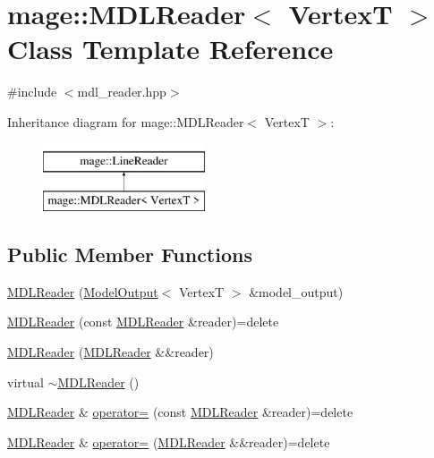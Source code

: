 \hypertarget{classmage_1_1_m_d_l_reader}{}\section{mage\+:\+:M\+D\+L\+Reader$<$ VertexT $>$ Class Template Reference}
\label{classmage_1_1_m_d_l_reader}


{\ttfamily \#include $<$mdl\+\_\+reader.\+hpp$>$}

Inheritance diagram for mage\+:\+:M\+D\+L\+Reader$<$ VertexT $>$\+:\begin{figure}[H]
\begin{center}
\leavevmode
\includegraphics[height=2.000000cm]{classmage_1_1_m_d_l_reader}
\end{center}
\end{figure}
\subsection*{Public Member Functions}
\begin{DoxyCompactItemize}
\item 
\hyperlink{classmage_1_1_m_d_l_reader_a068ed8c9101b42033ea166ab7aa03c04}{M\+D\+L\+Reader} (\hyperlink{structmage_1_1_model_output}{Model\+Output}$<$ VertexT $>$ \&model\+\_\+output)
\item 
\hyperlink{classmage_1_1_m_d_l_reader_ae7b3ee7b2b02101da041249e98f31bcc}{M\+D\+L\+Reader} (const \hyperlink{classmage_1_1_m_d_l_reader}{M\+D\+L\+Reader} \&reader)=delete
\item 
\hyperlink{classmage_1_1_m_d_l_reader_a6cf614b35564b50efc019289cf29011e}{M\+D\+L\+Reader} (\hyperlink{classmage_1_1_m_d_l_reader}{M\+D\+L\+Reader} \&\&reader)
\item 
virtual \hyperlink{classmage_1_1_m_d_l_reader_ae1e784f0c7449a2a34ffb90badc3d2da}{$\sim$\+M\+D\+L\+Reader} ()
\item 
\hyperlink{classmage_1_1_m_d_l_reader}{M\+D\+L\+Reader} \& \hyperlink{classmage_1_1_m_d_l_reader_a8cc5e9966283f3f9727fa28a75412ddb}{operator=} (const \hyperlink{classmage_1_1_m_d_l_reader}{M\+D\+L\+Reader} \&reader)=delete
\item 
\hyperlink{classmage_1_1_m_d_l_reader}{M\+D\+L\+Reader} \& \hyperlink{classmage_1_1_m_d_l_reader_a993c23d2e7f16f22a28e48ae9b7173b4}{operator=} (\hyperlink{classmage_1_1_m_d_l_reader}{M\+D\+L\+Reader} \&\&reader)=delete
\end{DoxyCompactItemize}
